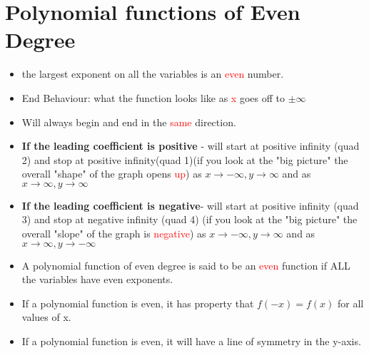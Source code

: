\documentclass{article}
\begin{document}
\section{Polynomial functions of Even Degree}
\begin{itemize}
    \item the largest exponent on all the variables is an \textcolor{red}{even} number.
    \item End Behaviour: what the function looks like as \textcolor{red}{x} goes off to $\pm \infty$
    \item Will always begin and end in the \textcolor{red}{same} direction.
    \item \textbf{If the leading coefficient is positive} - will start at positive infinity (quad 2) and stop at positive infinity(quad 1)(if you look at the "big picture" the overall "shape" of the graph opens \textcolor{red}{up}) as $x \to -\infty, y \to \infty$ and as $x \to \infty, y \to \infty$  
    \item \textbf{If the leading coefficient is negative}- will start at positive infinity (quad 3) and stop at negative infinity (quad 4) (if you look at the "big picture" the overall "slope" of the graph is \textcolor{red}{negative}) as $x \to -\infty, y \to \infty$ and as $x \to \infty, y \to -\infty$
    \item A polynomial function of even degree is said to be an \textcolor{red}{even} function if ALL the variables have even exponents.
    \item If a polynomial function is even, it has property that $f(-x)=f(x)$ for all values of x.
    \item If a polynomial function is even, it will have a line of symmetry in the y-axis. 
\end{itemize}
\end{document}
